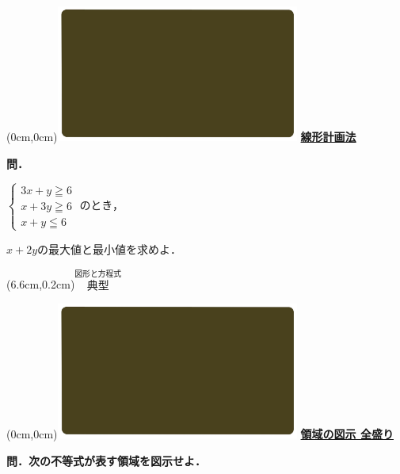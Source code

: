 \documentclass[10pt,
fleqn,
dvipdfmx,
uplatex
]{jsarticle}
\begin{document}
\newpage

\at(0cm,0cm){\includegraphics[width=8cm,bb=0 0 1920 1080]{./youtube/thumbnails/templates/smart_background/図形と方程式.jpeg}}
{\color{orange}\bf\boldmath\huge\underline{線形計画法}}\vspace{0.3zw}

\normalsize
\bf\boldmath 問．

\Large
\vspace{-1zw}
\hspace{1zw}
$\left\{\begin{array}{l}3x+y\geqq 6\;\\x+3y\geqq 6\;\\x+y\leqq 6\end{array}\right.$のとき，

\Large
\vspace{0.5zw}
\hspace{0.5zw}
$x+2y$の最大値と最小値\large を求めよ．

\at(6.6cm,0.2cm){\small\color{bradorange}$\overset{\text{図形と方程式}}{\text{典型}}$}

\newpage

\at(0cm,0cm){\includegraphics[width=8cm,bb=0 0 1920 1080]{./youtube/thumbnails/templates/smart_background/図形と方程式.jpeg}}
{\color{orange}\bf\boldmath\huge\underline{領域の図示 全盛り}}\vspace{0.3zw}

\small
\bf\boldmath 問．次の不等式が表す領域を図示せよ．
\end{document}
